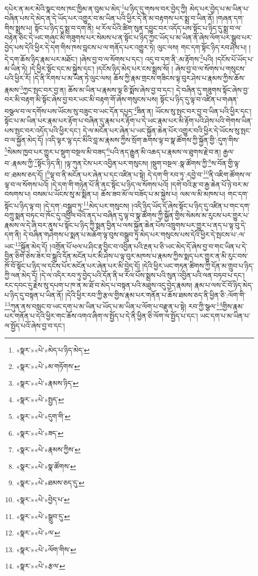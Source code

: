 དཔེར་ན་མར་མེའི་སྣང་བས་ཁང་ཁྱིམ་ན་བུམ་པ་མེད་\footnote{«སྣར་»«པེ་»མེད་པ་ཉིད་མེད་}པ་ཉིད་དུ་གསལ་བར་བྱེད་ཀྱི། མེད་པར་བྱེད་པ་མ་ཡིན་པ་བཞིན་པས་དེ་མེད་ན་དེ་ཡོད་པར་འགྱུར་བ་མ་ཡིན་པའི་ཕྱིར་དེ་ནི་མ་བརྟགས་པར་སྨྲ་བ་ཡིན་ནོ། །གཞན་དག་གིས་སྨྲས་པ། སྟོང་པ་ཉིད་དུ་སྨྲ་བ་དག་ནི། ཕ་རོལ་པོའི་ཚིག་སུན་དབྱུང་བར་འདོད་པས་སྟོང་པ་ཉིད་དུ་སྨྲ་བ་ལ་བརྟེན་ཅིང་དེ་ཡང་གཞུང་མི་གཟུགས་པར་སེམས་པ་ན་སྟོང་པ་ཉིད་ཀྱང་ཡོད་པ་མ་ཡིན་ནོ་ཞེས་ལོག་པར་སྒྲུབ་པར་བྱེད་པས་དེའི་ཕྱིར་དེ་དག་གིས་ཁས་བླངས་པ་ལ་གནོད་པར་འགྱུར་ཏེ། ལུང་ལས། གང་དག་སྟོང་ཉིད་རབ་ཤེས་པ། །དེ་དག་ཆོས་ཉིད་རྣམ་པར་མཐོང་། །ཞེས་བྱ་བ་ལ་སོགས་པ་དང་། འདུ་བ་དག་ནི་:མ་རྟོགས་\footnote{«སྣར་»«པེ་»མ་གཏོགས་}པའི། །དངོས་པོ་ཡོད་པ་མ་ཡིན་ཏེ། །དེ་ཕྱིར་སྟོང་དང་མ་སྐྱེས་དང་། །དངོས་ཉིད་མེད་པར་ངས་སྨྲས་སོ། །
ཞེས་བྱ་བ་ལ་སོགས་པ་གསུངས་པའི་ཕྱིར་རོ། །དེ་ནི་རིགས་པ་མ་ཡིན་ཏེ་ལུང་ལས། ཆོས་ཀྱི་རྣམ་གྲངས་གཟིངས་ལྟ་བུར་ཤེས་པ་རྣམས་ཀྱིས་ཆོས་རྣམས་\footnote{«སྣར་»«པེ་»རྣམས་ཉིད་}ཀྱང་སྤང་བར་བྱ་ན། ཆོས་མ་ཡིན་པ་རྣམས་ལྟ་ཅི་སྨོས་ཞེས་བྱ་བ་དང་། དེ་བཞིན་དུ་གཟུགས་སྟོང་ཞེས་བྱ་བར་མི་བརྟག་མི་སྟོང་ཞེས་བྱ་བར་ཡང་མི་བརྟག་གོ་ཞེས་གསུངས་པས། སྟོང་པ་ཉིད་དུ་ལྟ་བ་འཛིན་པ་གཞན་བསྩལ་བ་ལ་དགོས་པས་ཡོངས་སུ་བཟུང་བ་ཡང་དོན་དཔྱད་\footnote{«སྣར་»«པེ་»སྤྱད་}ཟིན་ན། ཡོངས་སུ་སྤང་བར་བྱ་བ་ཡིན་པའི་ཕྱིར་དང་། སྟོང་པ་མ་ཡིན་པར་རྣམ་པར་རྟོག་པ་བཞིན་དུ་རྣམ་པར་རྟོག་པ་དེ་ཡང་རྣམ་པར་མི་རྟོག་པའི་ཤེས་པའི་གེགས་ཡིན་པས་སྤང་བར་འདོད་པའི་ཕྱིར་དང་། དེ་ལ་མངོན་པར་ཞེན་པ་ཡང་སྐྱོན་ཆེན་པོར་འགྱུར་བའི་ཕྱིར་དེ་ཡོངས་སུ་སྤང་བ་ལ་སྐྱོན་མེད་དོ། །འདི་ལྟར་ལྷ་དང་མིའི་བླ་མ་རྣམས་ཀྱིས་སྲོག་ཆགས་ལྟ་བ་སྣ་ཚོགས་ཀྱི་སྐྱོན་གྱི་:དུག་གིས་\footnote{«སྣར་»«པེ་»དུག་གི་}སེམས་ཁྱབ་པར་གྱུར་པ་སྡུག་བསྔལ་མི་བཟད་\footnote{«སྣར་»«པེ་»ཟད་}པའི་ནད་རྒྱུན་མི་འཆད་པ་རྣམས་ལ་ཐུགས་རྗེ་བ་ན། རྒྱལ་བ་:རྣམས་ཀྱི་\footnote{«སྣར་»«པེ་»རྣམས་ཀྱིས་}སྟོང་ཉིད་ནི། །ལྟ་ཀུན་ངེས་པར་འབྱིན་པར་གསུངས། །སྡུག་བསྔལ་:སྣ་ཚོགས་ཀྱི་\footnote{«སྣར་»«པེ་»སྣ་ཚོགས་}ས་བོན་གྱི་ལྟ་བ་:ཐམས་ཅད་དོ། །\footnote{«སྣར་»«པེ་»ཐམས་ཅད་དུ་}ལྟ་བ་ནི་མངོན་པར་ཞེན་པ་དང་འཛིན་པ་སྟེ། དེ་དག་གི་རབ་ཏུ་:དབྱེ་བ་\footnote{«སྣར་»«པེ་»བྱེད་པ་}ནི་འཇིག་ཚོགས་ལ་ལྟ་བ་ལ་སོགས་པའོ། །དེ་དག་གི་གཉེན་པོ་ནི་ནང་སྟོང་པ་ཉིད་ལ་སོགས་པའོ། །དགེ་བའི་རྩ་བ་རྒྱ་ཆེན་པོ་ཉེ་བར་མ་བསགས་པ། བསམ་པ་ཡོངས་སུ་མ་སྨིན་པ། ཆོས་ཟབ་མོ་ལ་བཟོད་པ་མ་སྐྱེས་པ། ལམ་ལ་མི་མཁས་པ། གང་དག་སྟོང་པ་ཉིད་ལྟ་བ། །དེ་དག་:བསྒྲུབ་ཏུ་\footnote{«སྣར་»«པེ་»སྒྲུབ་དུ་}མེད་པར་གསུངས། །འདི་ཉིད་ཡོད་དོ་ཞེས་སྟོང་པ་ཉིད་དུ་འཛིན་པ་གང་དག་བཀྲུ་སྨན་བཏང་བ་ཁོང་དུ་འཁྱིལ་བའི་ནད་པ་བཞིན་དུ་ལྟ་བ་སྣ་ཚོགས་ཀྱི་སྐྱོན་གྱིས་སེམས་མ་རུངས་པར་གྱུར་པ་རྣམས་ལ་དེ་ཞི་བར་ནུས་པ་སྟོང་པ་ཉིད་ཀྱི་སྨན་བྱིན་པ་ལས་སྐྱོན་ཆེན་པོས་འཁྲུགས་པར་གྱུར་པ་ནད་པ་ལྟ་བུ་དེ་དག་ནི། དེ་བཞིན་གཤེགས་པ་སྨན་པ་མཆོག་ལྟ་བུས་བསྒྲུབ་ཏུ་མེད་པར་གསུངས་པས་དེའི་ཕྱིར་དེ་སྤངས་པ་:ལ་ཡང་\footnote{«སྣར་»«པེ་»ལ་}སྐྱོན་མེད་དོ། །འགྲོན་པོ་ཕལ་པ་ཤིང་རྟ་བྱིང་བ་འབྱིན་པའི་རྔན་པ་ཅི་ཡང་མེད་དོ་ཞེས་བྱ་བ་གང་ཡིན་པ་དེ་བྱིན་ཅིག་ཅེས་ཟེར་བ་སྒྲའི་དོན་མངོན་པར་མི་ཤེས་པ་ལྟ་བུར་མཁས་པ་རྣམས་ཀྱིས་སྨད་པར་གྱུར་ན་མི་རུང་བས་ཁོ་བོ་སྟོང་པ་ཉིད་ལ་དངོས་པོར་མངོན་པར་ཞེན་པར་མི་བྱེད་དོ། །དེའི་ཕྱིར་ཡང་གཏན་ཚིགས་ཀྱི་དོན་མ་གྲུབ་པ་ཉིད་ཀྱི་ལན་མེད་དོ། །དེ་ལ་འདིར་རབ་ཏུ་བྱེད་པའི་དོན་ནི་ཕ་རོལ་པོས་སྨྲས་པའི་སུན་འབྱིན་པའི་ལན་བཏབ་པ་དང་། རང་དབང་དུ་རྗེས་སུ་དཔག་པ་ཁ་ན་མ་ཐོ་བ་མེད་པ་བསྟན་པའི་མཐུས་འདུ་བྱེད་རྣམས། རྣམ་པ་ལས་ངོ་བོ་ཉིད་མེད་པ་ཉིད་དུ་བསྟན་པ་ཡིན་ནོ། །དེའི་ཕྱིར་རབ་ཀྱི་རྩལ་གྱིས་རྣམ་པར་གནོན་པ་ཆོས་ཐམས་ཅད་ནི་ཕྱིན་ཅི་:ལོག་གི་\footnote{«སྣར་»«པེ་»ལོག་གིས་}ཀུན་ནས་བསླང་བ་ཡང་དག་པ་མ་ཡིན་པ་ཡོད་པ་མ་ཡིན་པ་ལོག་པ་བརྫུན་པ་སྟེ། རབ་ཀྱི་སྩལ་\footnote{«སྣར་»«པེ་»རྩལ་}གྱིས་རྣམ་པར་གནོན་པ་དེའི་ཕྱིར་གང་ཆོས་འགའ་ཞིག་ལ་སྤྱོད་པ་དེ་ནི་ཕྱིན་ཅི་ལོག་ལ་སྤྱོད་པ་དང་། ཡང་དག་པ་མ་ཡིན་པ་ལ་སྤྱོད་པའོ་ཞེས་བྱ་བ་དང་། 